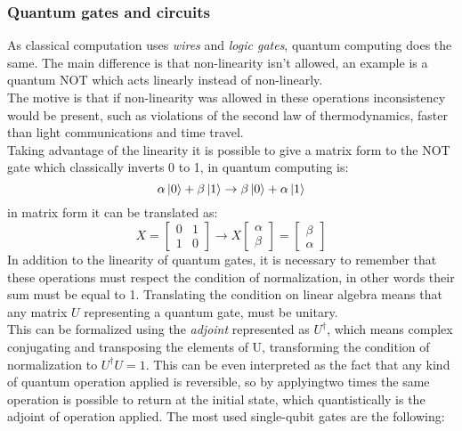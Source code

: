 \subsubsection{Quantum gates and circuits}
As classical computation uses \textit{wires} and \textit{logic gates}, quantum computing does the same. The main difference is that non-linearity isn't allowed, an example is a quantum NOT which acts linearly instead of non-linearly.\\
The motive is that if non-linearity was allowed in these operations inconsistency would be present, such as violations of the second law of thermodynamics, faster than light communications and time travel.\\
Taking advantage of the linearity it is possible to give a matrix form to the NOT gate which classically inverts 0 to 1, in quantum computing is:
\begin{equation*}
	\alpha \ket{0} + \beta \ket{1} \to \beta \ket{0} + \alpha \ket{1}
\end{equation*}
in matrix form it can be translated as:
\begin{equation*}
	X = \begin{bmatrix}
		0 & 1 \\
		1 & 0
	\end{bmatrix}
	\to
	X \begin{bmatrix}
		\alpha \\
		\beta
	\end{bmatrix}
	= \begin{bmatrix}
		\beta \\
		\alpha
	\end{bmatrix}
\end{equation*}
In addition to the linearity of quantum gates, it is necessary to remember that these operations must respect the condition of normalization, in other words their sum must be equal to 1. Translating the condition on linear algebra means that any matrix $U$ representing a quantum gate, must be unitary.\\
This can be formalized using the \textit{adjoint} represented as $U^\dag$, which means complex conjugating and transposing the elements of U, transforming the condition of normalization to $U^\dag U = 1$. This can be even interpreted as the fact that any kind of quantum operation applied is reversible, so by applyingtwo times the same operation is possible to return at the initial state, which quantistically is the adjoint of operation applied.
The most used single-qubit gates are the following:
